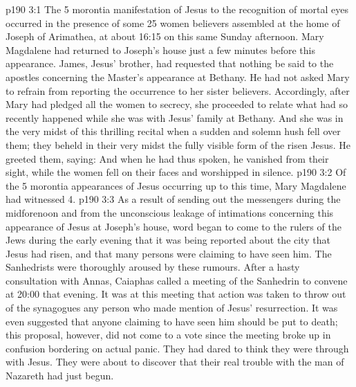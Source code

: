 \vs p190 3:1 The 5 morontia manifestation of Jesus to the recognition of mortal eyes occurred in the presence of some 25 women believers assembled at the home of Joseph of Arimathea, at about 16:15 on this same Sunday afternoon. Mary Magdalene had returned to Joseph’s house just a few minutes before this appearance. James, Jesus’ brother, had requested that nothing be said to the apostles concerning the Master’s appearance at Bethany. He had not asked Mary to refrain from reporting the occurrence to her sister believers. Accordingly, after Mary had pledged all the women to secrecy, she proceeded to relate what had so recently happened while she was with Jesus’ family at Bethany. And she was in the very midst of this thrilling recital when a sudden and solemn hush fell over them; they beheld in their very midst the fully visible form of the risen Jesus. He greeted them, saying:  And when he had thus spoken, he vanished from their sight, while the women fell on their faces and worshipped in silence.
\vs p190 3:2 \pc Of the 5 morontia appearances of Jesus occurring up to this time, Mary Magdalene had witnessed 4.
\vs p190 3:3 \pc As a result of sending out the messengers during the midforenoon and from the unconscious leakage of intimations concerning this appearance of Jesus at Joseph’s house, word began to come to the rulers of the Jews during the early evening that it was being reported about the city that Jesus had risen, and that many persons were claiming to have seen him. The Sanhedrists were thoroughly aroused by these rumours. After a hasty consultation with Annas, Caiaphas called a meeting of the Sanhedrin to convene at 20:00 that evening. It was at this meeting that action was taken to throw out of the synagogues any person who made mention of Jesus’ resurrection. It was even suggested that anyone claiming to have seen him should be put to death; this proposal, however, did not come to a vote since the meeting broke up in confusion bordering on actual panic. They had dared to think they were through with Jesus. They were about to discover that their real trouble with the man of Nazareth had just begun.
